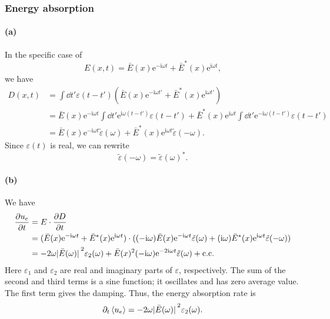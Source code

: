 \documentclass[hyperref, a4paper]{article}
\newcommand*{\ii}{\mathrm{i}}
\newcommand*{\ee}{\mathrm{e}}
\begin{document}
\subsubsection{Energy absorption}\label{sec:absorption}

\paragraph{(a)} In the specific case of 
\begin{equation}
    E(x, t) = \bar{E}(x) \ee^{- \ii \omega t} + \bar{E}^*(x) \ee^{\ii \omega t},
\end{equation}
we have 
\begin{equation}
    \begin{aligned}
        D(x, t) &= \int \dd{t'} \varepsilon(t - t') (
            \bar{E}(x) \ee^{- \ii \omega t'} + \bar{E}^*(x) \ee^{\ii \omega t'}
        ) \\
        &= \bar{E}(x) \ee^{- \ii \omega t} \int \dd{t'} 
        \ee^{\ii \omega (t - t')} \varepsilon(t - t') 
        + \bar{E}^*(x) \ee^{\ii \omega t} \int \dd{t'} 
        \ee^{- \ii \omega (t - t')} \varepsilon(t - t' ) \\
        &= \bar{E}(x) \ee^{- \ii \omega t} \tilde{\varepsilon}(\omega)
        + \bar{E}^*(x) \ee^{\ii \omega t} \tilde{\varepsilon}(- \omega).
    \end{aligned}
\end{equation}
Since $\varepsilon(t)$ is real, we can rewrite 
\begin{equation}
    \tilde{\varepsilon}(- \omega) = \tilde{\varepsilon}(\omega)^*.
\end{equation}

\paragraph{(b)} We have 
\begin{equation}
    \begin{aligned}
        \pdv{u_e}{t} &= E \cdot \pdv{D}{t} \\
        &= (
            \bar{E}(x) \ee^{- \ii \omega t} + \bar{E}^*(x) \ee^{\ii \omega t}
        ) \cdot (
            (- \ii \omega) \bar{E}(x) \ee^{- \ii \omega t} \tilde{\varepsilon}(\omega)
            + (\ii \omega) \bar{E}^*(x) \ee^{\ii \omega t} \tilde{\varepsilon}(- \omega)
        ) \\
        &= - 2 \omega \abs*{\bar{E}(\omega)}^2 \varepsilon_2(\omega)
        + \bar{E}(x)^2 (- \ii \omega) \ee^{- 2 \ii \omega t} \tilde{\varepsilon}(\omega)
        + \text{c.c.}
    \end{aligned}
    \label{eq:ue-change}
\end{equation}
Here $\varepsilon_1$ and $\varepsilon_2$ 
are real and imaginary parts of $\varepsilon$, respectively.
The sum of the second and third terms is a sine function; 
it oscillates and has zero average value.
The first term gives the damping.
Thus, the energy absorption rate is 
\begin{equation}
    \partial_t \expval{u_e} = - 2 \omega \abs*{\bar{E}(\omega)}^2 \varepsilon_2(\omega).
\end{equation}
\end{document}
